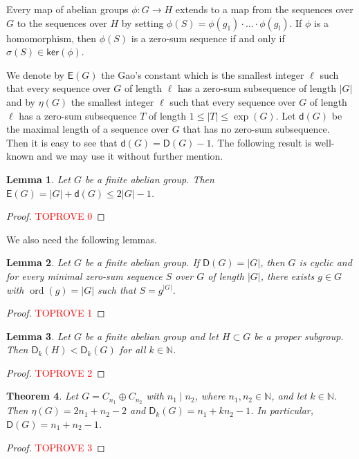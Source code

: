 \documentclass[11pt]{amsart}
\newtheorem{theorem}{Theorem}[section]
\newtheorem{lemma}[theorem]{Lemma}
\theoremstyle{definition}
\newcommand{\N}{\mathbb N}
\DeclareMathOperator{\ord}{ord}
\numberwithin{equation}{section}
\begin{document}
Every map of abelian groups $\phi: G\rightarrow H$ extends to a map from the sequences over $G$ to the sequences over $H$ by setting $\phi(S)=\phi(g_1)\cdot \ldots \cdot \phi(g_l)$. If $\phi$ is a homomorphism, then $\phi(S)$ is a zero-sum sequence if and only if $\sigma(S)\in \mathsf{ker}(\phi)$.


We denote by $\mathsf E(G)$ the Gao's constant which is the smallest integer $\ell$ such that every sequence over $G$ of length $\ell$ has a zero-sum subsequence of length $|G|$ and by $\eta(G)$ the smallest integer $\ell$ such that every sequence over $G$ of length $\ell$ has a zero-sum subsequence $T$ of length $1\le |T|\le \exp(G)$. 
Let $\mathsf d(G)$ be the maximal length of a sequence over $G$ that has no zero-sum subsequence. Then it is easy to see that $\mathsf d(G)=\mathsf D(G)-1$.
The following result is well-known and we may use it without further mention.

\begin{lemma}\label{le-E}
	Let $G$ be a finite abelian group. Then $\mathsf E(G)=|G|+\mathsf d(G)\le 2|G|-1$.
 	\end{lemma}
\begin{proof}\textcolor{red}{TOPROVE 0}\end{proof}

We also need the following lemmas.
\begin{lemma}\label{le-cyc}
	Let $G$ be a finite abelian group. If $\mathsf D(G)=|G|$, then $G$ is cyclic and for every minimal zero-sum sequence $S$ over $G$ of length $|G|$,  there exists $g\in G$ with $\ord(g)=|G|$ such that $S=g^{|G|}$.
\end{lemma}
\begin{proof}\textcolor{red}{TOPROVE 1}\end{proof}

\begin{lemma}\label{le-subgroup}
	Let $G$ be a finite abelian group and let $H\subset G$ be a proper subgroup. Then $\mathsf D_k(H)<\mathsf D_k(G)$ for all $k\in \N$.
\end{lemma}
\begin{proof}\textcolor{red}{TOPROVE 2}\end{proof}





\begin{theorem}\label{th-gen}
Let  $G = C_{n_1} \oplus C_{n_2}$  with $n_1 \mid n_2$, where $n_1,n_2\in \N$, and let $k\in \N$. Then $\eta(G)=2n_1+n_2-2$ and $\mathsf D_k(G)=n_1+kn_2-1$. In particular, $\mathsf D(G)=n_1+n_2-1$.
\end{theorem}
\begin{proof}\textcolor{red}{TOPROVE 3}\end{proof}
\end{document}
